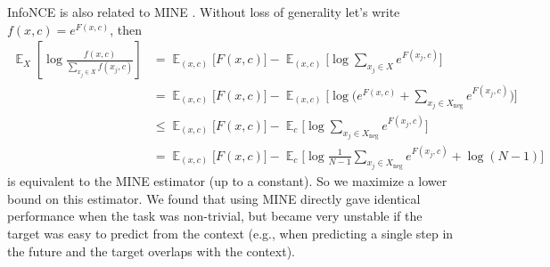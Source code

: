 InfoNCE is also related to MINE \cite{belghazi2018mine}. Without loss of generality let's write $f(x, c) = e^{F(x, c)}$, then
\begin{align}
\mathop{{}\mathbb{E}}_{X}\left[ \log \frac{f(x, c)}{\sum_{x_j \in X} f(x_j, c)}\right] 
&= \mathop{{}\mathbb{E}}_{(x, c)} \Big[F(x, c)\Big] - \mathop{{}\mathbb{E}}_{(x, c)}\Big[\log\sum_{x_j \in X} e^{F(x_j, c)}\Big] \\
&= \mathop{{}\mathbb{E}}_{(x, c)} \Big[F(x, c)\Big] - \mathop{{}\mathbb{E}}_{(x, c)}\Big[\log \Big(e^{F(x, c)} + \sum_{x_j \in X_{\text{neg}}} e^{F(x_j, c)}\Big)\Big] \\
&\leq \mathop{{}\mathbb{E}}_{(x, c)} \Big[F(x, c)\Big] - \mathop{{}\mathbb{E}}_{c}\Big[\log \sum_{x_j \in X_{\text{neg}}} e^{F(x_j, c)}\Big] \\
&= \mathop{{}\mathbb{E}}_{(x, c)} \Big[F(x, c)\Big] - \mathop{{}\mathbb{E}}_{c}\Big[\log \frac{1}{N-1}\sum_{x_j \in X_{\text{neg}}} e^{F(x_j, c)} + \log(N-1)\Big]
\end{align}
is equivalent to the MINE estimator (up to a constant). So we maximize a lower bound on this estimator. We found that using MINE directly gave identical performance when the task was non-trivial, but became very unstable if the target was easy to predict from the context (e.g., when predicting a single step in the future and the target overlaps with the context).